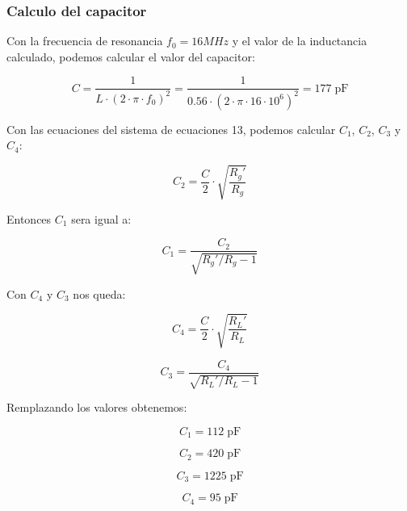 \subsubsection{Calculo del capacitor}

Con la frecuencia de resonancia $f_0 = 16 MHz$ y el valor de la inductancia calculado, podemos calcular el valor del capacitor:

\begin{equation}
    C = \frac{1}{L \cdot (2 \cdot \pi \cdot f_0)^2} = \frac{1}{0.56 \cdot (2 \cdot \pi \cdot 16 \cdot 10^6)^2} = 177\; \text{pF}
\end{equation}

Con las ecuaciones del sistema de ecuaciones 13, podemos calcular $C_1$, $C_2$, $C_3$ y $C_4$:

\begin{equation}
    C_2 = \frac{C}{2} \cdot \sqrt{\frac{R_g'}{R_g}}
\end{equation}

Entonces $C_1$ sera igual a: 

\begin{equation}
    C_1 = \frac{C_2}{\sqrt{R_g' / R_g - 1}}
\end{equation}

Con $C_4$ y $C_3$ nos queda:

\begin{equation}
    C_4 = \frac{C}{2} \cdot \sqrt{\frac{R_L'}{R_L}}
\end{equation}

\begin{equation}
    C_3 = \frac{C_4}{\sqrt{R_L' / R_L - 1}}
\end{equation}

Remplazando los valores obtenemos:


\begin{equation}
    C_1 = 112\; \text{pF}
\end{equation}

\begin{equation}
    C_2 = 420\; \text{pF}
\end{equation}

\begin{equation}
    C_3 = 1225\; \text{pF}
\end{equation}

\begin{equation}
    C_4 = 95\; \text{pF}
\end{equation}

